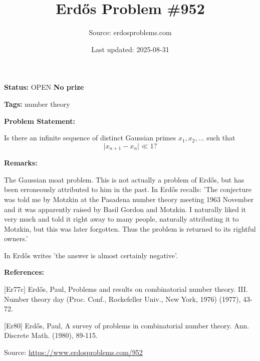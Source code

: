 \documentclass{article}
\title{Erd\H{o}s Problem \#952}
\date{Last updated: 2025-08-31}
\author{Source: erdosproblems.com}
\begin{document}
\maketitle

\noindent\textbf{Status:} OPEN \quad \textbf{No prize}

\noindent\textbf{Tags:} number theory

\medskip
\noindent\textbf{Problem Statement:}

Is there an infinite sequence of distinct Gaussian primes $x_1,x_2,\ldots$ such that\[\lvert x_{n+1}-x_n\rvert \ll 1?\]

\bigskip
\noindent\textbf{Remarks:}

The Gaussian moat problem. This is not actually a problem of Erd\H{o}s, but has been erroneously attributed to him in the past. In \cite{Er77c} Erd\H{o}s recalls: 'The conjecture was told me by Motzkin at the Pasadena number theory meeting 1963 November and it was apparently raised by Basil Gordon and Motzkin. I naturally liked it very much and told it right away to many people, naturally attributing it to Motzkin, but this was later forgotten. Thus the problem is returned to its rightful owners.'

In \cite{Er80} Erd\H{o}s writes 'the answer is almost certainly negative'.

\bigskip
\noindent\textbf{References:}

[Er77c] Erd\H{o}s, Paul, Problems and results on combinatorial number theory. III. Number theory day (Proc. Conf., Rockefeller Univ.,
New York, 1976) (1977), 43-72.
 
 [Er80] Erd\H{o}s, Paul, A survey of problems in combinatorial number theory. Ann. Discrete Math. (1980), 89-115.

\bigskip
\noindent\small{Source: \url{https://www.erdosproblems.com/952}}
\end{document}
